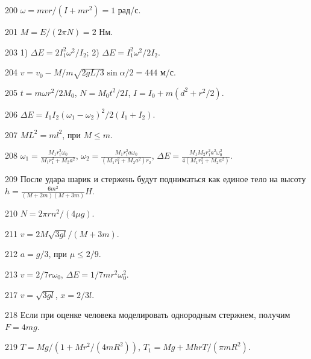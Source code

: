 \begin{Answer}{200}
$\omega = mvr/(I+mr^2) = 1$ рад/с.
\end{Answer}
\begin{Answer}{201}
$M = E / (2 \pi N) = 2$ Нм.
\end{Answer}
\begin{Answer}{203}
1) $\Delta E = 2I_1^2\omega^2/I_2$; 2) $\Delta E = I_1^2\omega^2/2I_2$.
\end{Answer}
\begin{Answer}{204}
$v = v_0 -M/m \sqrt{2gL/3} \sin \alpha /2 = 444$ м/с.
\end{Answer}
\begin{Answer}{205}
$t = m\omega r^2 / 2M_0$, $N = M_0t^2/2I$, $I = I_0 + m(d^2 + r^2/2)$.
\end{Answer}
\begin{Answer}{206}
$\Delta E = I_1 I_2 (\omega_1 - \omega_2)^2/ 2(I_1 + I_2)$.
\end{Answer}
\begin{Answer}{207}
$ML^2 = ml^2$, при $M \leq m$.
\end{Answer}
\begin{Answer}{208}
$\omega_1 = \frac{M_1r_1^2\omega_0}{M_1r_1^2 + M_2a^2}$, $\omega_2 = \frac{M_1r_1^2 a \omega_0}{(M_1r_1^2 + M_2a^2)r_2}$, $\Delta E = \frac{M_1 M_2r_1^2a^2\omega_0^2}{4(M_1r_1^2 + M_2a^2)}$.
\end{Answer}
\begin{Answer}{209}
После удара шарик и стержень будут подниматься как единое тело на высоту $h = \frac{6m^2}{(M+2m)(M+3m)}H$.
\end{Answer}
\begin{Answer}{210}
$N = 2\pi r n^2/(4 \mu g)$.
\end{Answer}
\begin{Answer}{211}
$v = 2M\sqrt{3gl}/(M+3m)$.
\end{Answer}
\begin{Answer}{212}
$a = g/3$, при $\mu \leq 2/9$.
\end{Answer}
\begin{Answer}{213}
$v = 2/7r \omega_0$, $\Delta E = 1/7 mr^2 \omega_0^2$.
\end{Answer}
\begin{Answer}{217}
$v = \sqrt{3gl}$, $x = 2/3l$.
\end{Answer}
\begin{Answer}{218}
Если при оценке человека моделировать однородным стержнем, получим $F = 4mg$.
\end{Answer}
\begin{Answer}{219}
$T = Mg/(1 + Mr^2/(4mR^2))$, $T_1 = Mg + MhrT/(\pi m R^2)$.
\end{Answer}

